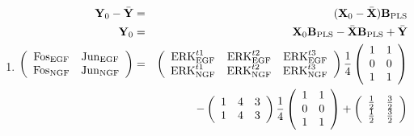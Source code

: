 \begin{enumerate}
\item \begin{eqnarray*}
{\mathbf Y}_0 - \bar{\mathbf Y} & = & ( {\mathbf X}_0 - \bar{\mathbf X} ) {\mathbf B}_{\rm PLS} \\
{\mathbf Y}_0 & = & {\mathbf X}_0 {\mathbf B}_{\rm PLS} - \bar{\mathbf X}{\mathbf B}_{\rm PLS} + \bar{\mathbf Y}\\
\left(
\begin{array}{cc}
{\rm Fos}_{\rm EGF} & {\rm Jun}_{\rm EGF} \\
{\rm Fos}_{\rm NGF} & {\rm Jun}_{\rm NGF} \\
\end{array}
\right)
& = & 
\left(
\begin{array}{ccc}
{\rm ERK}^{t1}_{\rm EGF} & {\rm ERK}^{t2}_{\rm EGF} & {\rm ERK}^{t3}_{\rm EGF} \\
{\rm ERK}^{t1}_{\rm NGF} & {\rm ERK}^{t2}_{\rm NGF} & {\rm ERK}^{t3}_{\rm NGF} \\
\end{array}
\right)
\frac{1}{4}
\left(
\begin{array}{rr}
1 & 1 \\
0 & 0 \\
1 & 1 \\
\end{array}
\right)
\\
 & & 
- \left(
\begin{array}{ccc}
1 & 4 & 3 \\
1 & 4 & 3 \\
\end{array}
\right)
\frac{1}{4}
\left(
\begin{array}{rr}
1 & 1 \\
0 & 0 \\
1 & 1 \\
\end{array}
\right) 
+
\left(
\begin{array}{rr}
\frac{1}{2} & \frac{3}{2} \\
\frac{1}{2} & \frac{3}{2} \\
\end{array}
\right) 
\\
\end{eqnarray*}


\end{enumerate}
